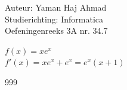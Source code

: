 \documentclass[a4paper]{article}
\begin{document}
\noindent \large Auteur: Yaman Haj Ahmad \\
\noindent \large Studierichting: Informatica\\
\noindent \large Oefeningenreeks 3A nr. 34.7\\

\medskip

\normalsize

$f(x) = xe^x$\\

$f'(x) = xe^x + e^x = e^x\left(x+1\right)$\\

\begin{thebibliography}{999}
\end{thebibliography}
\end{document}
